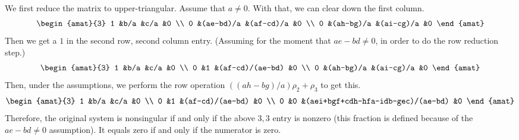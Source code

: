 \begin{Answer}
         We first reduce the matrix to upper-triangular.
         Assume that \( a\neq 0 \).
         With that, we can clear down the first column.
         \begin{equation*}
           \begin{amat}{3}
              1   &b/a           &c/a        &0   \\
              0   &(ae-bd)/a     &(af-cd)/a  &0   \\
              0   &(ah-bg)/a     &(ai-cg)/a  &0
            \end{amat}                                            
         \end{equation*}
         Then we get a $1$ in the second row, second column entry.
         (Assuming for the moment that \( ae-bd\neq 0 \), in order
         to do the row reduction step.)
         \begin{equation*}
           \begin{amat}{3}
              1   &b/a           &c/a             &0  \\
              0   &1             &(af-cd)/(ae-bd) &0  \\
              0   &(ah-bg)/a     &(ai-cg)/a       &0
            \end{amat}
         \end{equation*}
         Then, under the assumptions, we perform
         the row operation $((ah-bg)/a)\rho_2+\rho_3$
         to get this.
         \begin{equation*}
           \begin{amat}{3}
              1   &b/a   &c/a                              &0 \\
              0   &1     &(af-cd)/(ae-bd)                   &0 \\
              0   &0     &(aei+bgf+cdh-hfa-idb-gec)/(ae-bd) &0
            \end{amat}
         \end{equation*}
         Therefore, the original system is nonsingular
         if and only if the above \( 3,3 \) entry is nonzero
         (this fraction is defined because of the \( ae-bd\neq 0 \) assumption).
         It equals zero if and only if the numerator is zero. 


\end{Answer}
